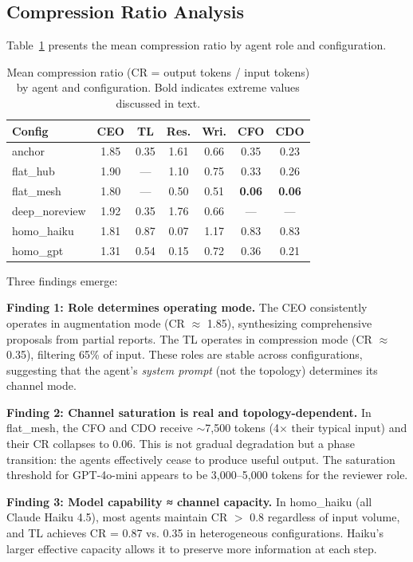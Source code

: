 \documentclass[conference]{IEEEtran}
\begin{document}
\subsection{Compression Ratio Analysis}

Table~\ref{tab:cr} presents the mean compression ratio by agent role and configuration.

\begin{table}[t]
\centering
\caption{Mean compression ratio (CR = output tokens / input tokens) by agent and configuration. Bold indicates extreme values discussed in text.}
\label{tab:cr}
\small
\begin{tabular}{lcccccc}
\toprule
\textbf{Config} & \textbf{CEO} & \textbf{TL} & \textbf{Res.} & \textbf{Wri.} & \textbf{CFO} & \textbf{CDO} \\
\midrule
anchor       & 1.85 & 0.35 & 1.61 & 0.66 & 0.35 & 0.23 \\
flat\_hub    & 1.90 & ---  & 1.10 & 0.75 & 0.33 & 0.26 \\
flat\_mesh   & 1.80 & ---  & 0.50 & 0.51 & \textbf{0.06} & \textbf{0.06} \\
deep\_noreview & 1.92 & 0.35 & 1.76 & 0.66 & ---  & ---  \\
homo\_haiku  & 1.81 & 0.87 & 0.07 & 1.17 & 0.83 & 0.83 \\
homo\_gpt    & 1.31 & 0.54 & 0.15 & 0.72 & 0.36 & 0.21 \\
\bottomrule
\end{tabular}
\end{table}

Three findings emerge:

\textbf{Finding 1: Role determines operating mode.}
The CEO consistently operates in augmentation mode (CR $\approx$ 1.85), synthesizing comprehensive proposals from partial reports.
The TL operates in compression mode (CR $\approx$ 0.35), filtering 65\% of input.
These roles are stable across configurations, suggesting that the agent's \emph{system prompt} (not the topology) determines its channel mode.

\textbf{Finding 2: Channel saturation is real and topology-dependent.}
In flat\_mesh, the CFO and CDO receive $\sim$7,500 tokens (4$\times$ their typical input) and their CR collapses to 0.06.
This is not gradual degradation but a phase transition: the agents effectively cease to produce useful output.
The saturation threshold for GPT-4o-mini appears to be 3,000--5,000 tokens for the reviewer role.

\textbf{Finding 3: Model capability ≈ channel capacity.}
In homo\_haiku (all Claude Haiku 4.5), most agents maintain CR $>$ 0.8 regardless of input volume, and TL achieves CR = 0.87 vs. 0.35 in heterogeneous configurations.
Haiku's larger effective capacity allows it to preserve more information at each step.
\end{document}
